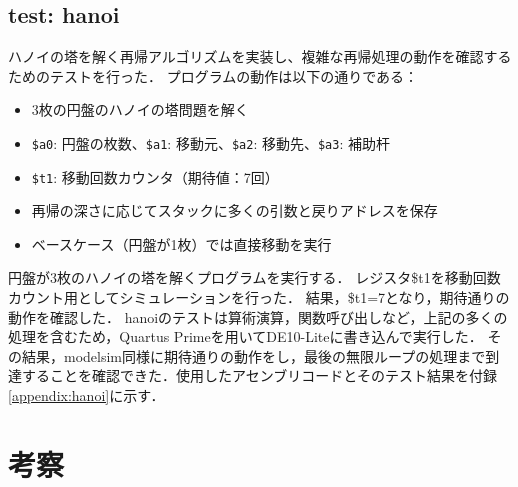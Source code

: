 \documentclass[dvipdfmx]{jsarticle}
\begin{document}
\subsection{test: hanoi}
ハノイの塔を解く再帰アルゴリズムを実装し、複雑な再帰処理の動作を確認するためのテストを行った．
プログラムの動作は以下の通りである：
\begin{itemize}
\item 3枚の円盤のハノイの塔問題を解く
\item \texttt{\$a0}: 円盤の枚数、\texttt{\$a1}: 移動元、\texttt{\$a2}: 移動先、\texttt{\$a3}: 補助杆
\item \texttt{\$t1}: 移動回数カウンタ（期待値：7回）
\item 再帰の深さに応じてスタックに多くの引数と戻りアドレスを保存
\item ベースケース（円盤が1枚）では直接移動を実行
\end{itemize}
円盤が3枚のハノイの塔を解くプログラムを実行する．
レジスタ\$t1を移動回数カウント用としてシミュレーションを行った．
結果，\$t1=7となり，期待通りの動作を確認した．
hanoiのテストは算術演算，関数呼び出しなど，上記の多くの処理を含むため，Quartus Primeを用いてDE10-Liteに書き込んで実行した．
その結果，modelsim同様に期待通りの動作をし，最後の無限ループの処理まで到達することを確認できた．使用したアセンブリコードとそのテスト結果を付録\ref{appendix:hanoi}に示す．



\section{考察}
\end{document}
